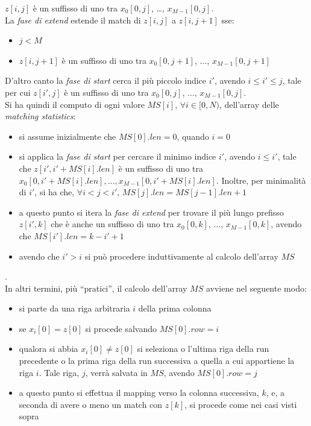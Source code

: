 $z[i,j]$ è un suffisso di uno tra $x_0[0,j]$, \ldots, $x_{M-1}[0,j]$. \\
La \textit{fase di extend}  estende il match di $z[i,j]$ a $z[i,j+1]$ sse:
\begin{itemize}
  \item $j<M$
  \item $z[i,j+1]$ è un suffisso di uno tra $x_0[0,j+1]$, $\ldots$,
  $x_{M-1}[0,j+1]$ 
\end{itemize}
D'altro canto la \textit{fase di start} cerca il più piccolo indice $i'$,
avendo $i\leq i'\leq j$, tale per cui $z[i',j]$ è un suffisso di uno tra
$x_0[0,j]$, $\ldots$, $x_{M-1}[0,j]$.\\
Si ha quindi il computo di ogni valore $MS[i]$, $\forall i\in[0,N)$, dell'array
delle \textit{matching statistics}:
\begin{itemize}
  \item si assume inizialmente che $MS[0].len=0$, quando $i=0$
  \item si applica la \textit{fase di start} per cercare il minimo indice
  $i'$, avendo $i\leq i'$, tale che $z[i',i'+MS[i].len]$ è un suffisso di uno
  tra $x_0[0,i'+MS[i].len], \ldots, x_{M-1}[0,i'+MS[i].len]$. Inoltre, per
  minimalità di $i'$, si ha che, $\forall i<j<i'$, $MS[j].len=MS[j-1].len+1$
  \item a questo punto si itera la \textit{fase di extend} per trovare il
  più lungo prefisso $z[i',k]$ che è anche un suffisso di uno tra $x_0[0,k]$,
  $\ldots$, $x_{M-1}[0,k]$, avendo che $MS[i'].len=k-i'+1$
  \item avendo che $i'>i$ si può procedere induttivamente al calcolo dell'array
  $MS$ 
\end{itemize}
.\\ 
In altri termini, più ``pratici'', il calcolo dell'array $MS$ avviene nel
seguente modo:
\begin{itemize}
  \item si parte da una riga arbitraria $i$ della prima colonna
  \item se $x_i[0]=z[0]$ si procede salvando $MS[0].row=i$
  \item qualora si abbia $x_i[0]\neq z[0]$ si seleziona o l'ultima riga della
  run precedente o la prima riga della run successiva a quella a cui appartiene
  la riga $i$. Tale riga, $j$, verrà salvata in $MS$, avendo $MS[0].row=j$
  \item a questo punto si effettua il mapping verso la colonna successiva, $k$,
  e, a seconda di avere o meno un match con $z[k]$, si procede come nei casi
  visti sopra 
\end{itemize}

